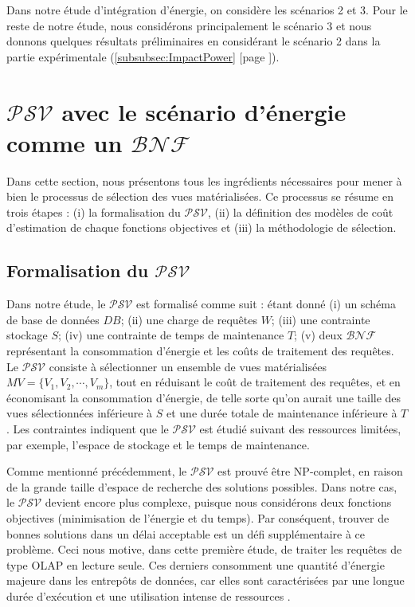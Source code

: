 Dans notre étude d'intégration d'énergie, on considère les scénarios 2 et 3.
Pour le reste de notre étude, nous considérons principalement le scénario 3 et nous donnons quelques résultats préliminaires en considérant le scénario 2 dans la partie expérimentale (\ref{subsubsec:ImpactPower} [page \pageref{subsubsec:ImpactPower}]).

\section{$\mathcal{PSV}$ avec le scénario d'énergie comme un $\mathcal{BNF}$}
Dans cette section, nous présentons tous les ingrédients nécessaires pour mener à bien le processus de sélection des vues matérialisées. Ce processus se résume en trois étapes : (i) la formalisation du $\mathcal{PSV}$, (ii) la définition des modèles de coût d'estimation de chaque fonctions objectives et (iii) la méthodologie de sélection.

\subsection{Formalisation du $\mathcal{PSV}$}
Dans notre étude, le $\mathcal{PSV}$ est formalisé comme suit : étant donné (i) un schéma de base de données $DB$; (ii) une charge de requêtes $W$; (iii) une contrainte stockage $S$; (iv) une contrainte de temps de maintenance $T$; (v) deux $\mathcal{BNF}$ représentant la consommation d'énergie et les coûts de traitement des requêtes.
Le $\mathcal{PSV}$ consiste à sélectionner un ensemble de vues matérialisées $MV = \{V_1, V_2, \cdots , V_m\}$, tout en réduisant le coût de traitement des requêtes, et en économisant la consommation d'énergie, de telle sorte qu'on aurait une taille des vues sélectionnées inférieure à $S$ et une durée totale de maintenance inférieure à $T$.
Les contraintes indiquent que le $\mathcal{PSV}$ est étudié suivant des ressources limitées, par exemple, l'espace de stockage et le temps de maintenance.

Comme mentionné précédemment, le $\mathcal{PSV}$ est prouvé être NP-complet, en raison de la grande taille d'espace de recherche des solutions possibles. Dans notre cas, le $\mathcal{PSV}$ devient encore plus complexe, puisque nous considérons deux fonctions objectives (minimisation de l'énergie et du temps). Par conséquent, trouver de bonnes solutions dans un délai acceptable est un défi supplémentaire à ce problème.
Ceci nous motive, dans cette première étude, de traiter les requêtes de type OLAP en lecture seule. Ces derniers consomment une quantité d'énergie majeure dans les entrepôts de données, car elles sont caractérisées par une longue durée d'exécution et une utilisation intense de ressources \cite{Kunjir12}.

